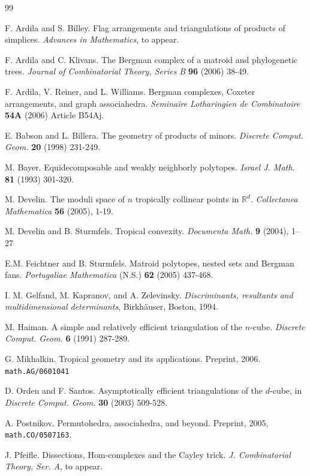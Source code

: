 \documentclass[11pt]{amsart}
\newcommand{\RR}{\mathbb{R}}
\begin{document}
\begin{thebibliography}{99} 
 



F. Ardila and S. Billey. Flag arrangements and triangulations of products of simplices. 
\emph{Advances in Mathematics}, to appear.

F. Ardila and C. Klivans. The Bergman complex of a matroid and phylogenetic trees. 
\emph{Journal of Combinatorial Theory, Series B} {\bf 96} (2006) 38-49. 

F. Ardila, V. Reiner, and L. Williams. Bergman complexes, Coxeter arrangements, and graph associahedra. \emph{Seminaire Lotharingien de Combinatoire} {\bf 54A} (2006) Article B54Aj.

E. Babson and L. Billera. The geometry of products of minors.
\emph{Discrete Comput. Geom.} {\bf 20} (1998) 231-249.

M. Bayer. Equidecomposable and weakly neighborly polytopes.
\emph{Israel J. Math.} {\bf 81} (1993) 301-320.

M. Develin. The moduli space of $n$ tropically collinear points in $\RR^d$. \emph{Collectanea Mathematica} {\bf 56} (2005), 1-19.

M. Develin and B. Sturmfels. Tropical convexity. \textit{Documenta 
Math.} {\bf 9} (2004), 1--27

E.M. Feichtner and B. Sturmfels. Matroid polytopes, nested sets and Bergman fans. \emph{Portugaliae Mathematica} (N.S.) {\bf 62} (2005) 437-468.

I. M. Gelfand, M. Kapranov, and A. Zelevinsky. \emph{
Discriminants, resultants and multidimensional determinants},
Birkh\"auser, Boston, 1994.

M. Haiman. A simple and relatively efficient triangulation of the
$n$-cube. \emph{Discrete Comput. Geom.} {\bf 6} (1991) 287-289.

G. Mikhalkin. Tropical geometry and its applications. Preprint, 2006. \texttt{math.AG/0601041}

D. Orden and F. Santos. Asymptotically efficient triangulations of
the $d$-cube, in \emph{Discrete Comput. Geom.} {\bf 30} (2003)
509-528.

A. Postnikov. Permutohedra, associahedra, and beyond. Preprint, 2005, \texttt{math.CO/0507163}. 

J. Pfeifle. Dissections, Hom-complexes and the Cayley trick. \emph{J. Combinatorial Theory, Ser. A}, to appear.


\end{thebibliography}
\end{document}
